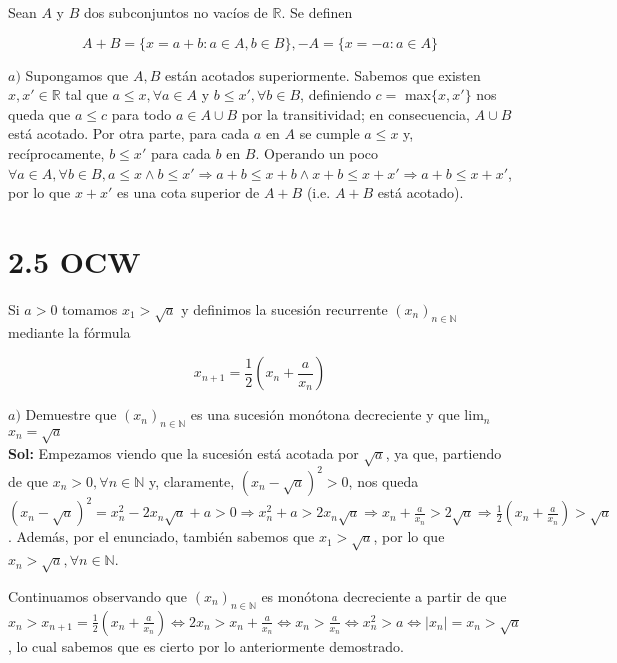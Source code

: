 \documentclass{article}
\begin{document}
Sean $A$ y $B$ dos subconjuntos no vacíos de $\mathbb{R}$. Se definen

\[A + B = \{x = a + b : a \in A, b \in B\}, -A = \{x = -a : a \in A\}\]

$a)$ Supongamos que $A, B$ están acotados superiormente. Sabemos que existen $x, x' \in \mathbb{R}$ tal que $a \leq x, \forall a \in A$ y $b \leq x', \forall b \in B$, definiendo $c =$ max$\{x, x'\}$ nos queda que $a \leq c$ para todo $a \in A \cup B$ por la transitividad; en consecuencia, $A \cup B$ está acotado. Por otra parte, para cada $a$ en $A$ se cumple $a \leq x$ y, recíprocamente, $b \leq x'$ para cada $b$ en $B$. Operando un poco $\forall a \in A, \forall b \in B, a \leq x \land b \leq x' \Longrightarrow a + b \leq x + b \land x + b \leq x + x' \Longrightarrow a + b \leq x + x'$, por lo que $x + x'$ es una cota superior de $A + B$ (i.e. $A + B$ está acotado).

\section{2.5 OCW}

Si $a > 0$ tomamos $x_1 > \sqrt{a}$ y definimos la sucesión recurrente $(x_n)_{n \in \mathbb{N}}$ mediante la fórmula

\[x_{n + 1} = \frac{1}{2}\left(x_n + \frac{a}{x_n}\right)\]

$a)$ Demuestre que $(x_n)_{n \in \mathbb{N}}$ es una sucesión monótona decreciente y que lim$_n$ $ x_n = \sqrt{a}$ \\

\textbf{Sol:} Empezamos viendo que la sucesión está acotada por $\sqrt{a}$, ya que, partiendo de que $x_n > 0, \forall n \in \mathbb{N}$ y, claramente, $(x_n - \sqrt{a})^2 > 0$, nos queda $(x_n - \sqrt{a})^2 = x_n^2 - 2x_n\sqrt{a} + a > 0 \Longrightarrow x_n^2 + a > 2x_n\sqrt{a} \Longrightarrow x_n + \frac{a}{x_n} > 2\sqrt{a} \Longrightarrow \frac{1}{2}\left(x_n + \frac{a}{x_n}\right) > \sqrt{a}$. Además, por el enunciado, también sabemos que $x_1 > \sqrt{a}$, por lo que $x_n > \sqrt{a}, \forall n \in \mathbb{N}$.

Continuamos observando que $(x_n)_{n \in \mathbb{N}}$ es monótona decreciente a partir de que $x_n > x_{n + 1} = \frac{1}{2}\left(x_n + \frac{a}{x_n}\right) \Longleftrightarrow 2x_n > x_n + \frac{a}{x_n} \Longleftrightarrow x_n > \frac{a}{x_n} \Longleftrightarrow x_n^2 > a \Longleftrightarrow |x_n| = x_n > \sqrt{a}$, lo cual sabemos que es cierto por lo anteriormente demostrado.
\end{document}
